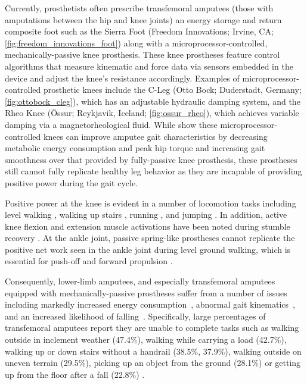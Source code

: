 Currently, prosthetists often prescribe transfemoral amputees (those with
amputations between the hip and knee joints) an energy storage and return
composite foot such as the Sierra Foot (Freedom Innovations; Irvine, CA;
\cref{fig:freedom_innovations_foot}) along with a microprocessor-controlled,
mechanically-passive knee prosthesis. These knee prostheses feature control
algorithms that measure kinematic and force data via sensors embedded in the
device and adjust the knee's resistance accordingly.  Examples of
microprocessor-controlled prosthetic knees include the C-Leg (Otto Bock;
Duderstadt, Germany; \cref{fig:ottobock_cleg}), which has an adjustable
hydraulic damping system, and the Rheo Knee (Össur; Reykjavik, Iceland;
\cref{fig:ossur_rheo}), which achieves variable damping via a magnetorheological
fluid. While \citet{johansson2005clinical} show these microprocessor-controlled
knees can improve amputee gait characteristics by decreasing metabolic energy
consumption and peak hip torque and increasing gait smoothness over that
provided by fully-passive knee prosthesis, these prostheses still cannot fully
replicate healthy leg behavior as they are incapable of providing positive power
during the gait cycle. 

Positive power at the knee is evident in a number of locomotion tasks including
level walking \citep{perry2010gait}, walking up stairs
\citep{nadeau2003frontal}, running \citep{buczek1990stance}, and jumping
\citep{hubley1983work}. In addition, active knee flexion and extension muscle
activations have been noted during stumble recovery \citep{eng1994strategies}.
At the ankle joint, passive spring-like prostheses cannot replicate the positive
net work seen in the ankle joint during level ground walking, which is essential
for push-off and forward propulsion \citep{perry2010gait}.

Consequently, lower-limb amputees, and especially transfemoral
amputees equipped with
mechanically-passive prostheses suffer from a number of issues including
markedly increased energy consumption~\citep{waters1976energy},
abnormal gait kinematics~\citep{jaegers1995prosthetic}, and an increased
likelihood of falling~\citep{miller2001prevalence}. Specifically, large
percentages of transfemoral amputees report they are unable to complete tasks
such as walking outside in inclement weather (47.4\%), walking while carrying a
load (42.7\%), walking up or down stairs without a handrail (38.5\%, 37.9\%),
walking outside on uneven terrain (29.5\%), picking up an object from the ground
(28.1\%) or getting up from the floor after a fall (22.8\%)
\citep{gauthier1999enabling}.

